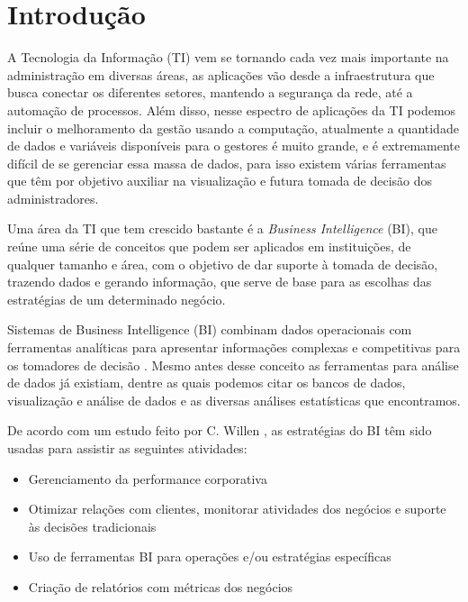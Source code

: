 \chapter*{Introdução}

A Tecnologia da Informação (TI) vem se tornando cada vez mais importante na administração em diversas áreas, as aplicações vão desde a infraestrutura que busca conectar os diferentes setores, mantendo a segurança da rede, até a automação de processos. Além disso, nesse espectro de aplicações da TI podemos incluir o melhoramento da gestão usando a computação, atualmente a quantidade de dados e variáveis disponíveis para o gestores é muito grande, e é extremamente difícil de se gerenciar essa massa de dados, para isso existem várias ferramentas que têm por objetivo auxiliar na visualização e futura tomada de decisão dos administradores.

Uma área da TI que tem crescido bastante é a \textit{Business Intelligence} (BI), que reúne uma série de conceitos que podem ser aplicados em instituições, de qualquer tamanho e área, com o objetivo de dar suporte à tomada de decisão, trazendo dados e gerando informação, que serve de base para as escolhas das estratégias de um determinado negócio.

Sistemas de Business Intelligence (BI) combinam dados operacionais com ferramentas analíticas para apresentar informações complexas e competitivas para os tomadores de decisão \cite{negash1}. Mesmo antes desse conceito as ferramentas para análise de dados já existiam, dentre as quais podemos citar os bancos de dados, visualização e análise de dados e as diversas análises estatísticas que encontramos.

De acordo com um estudo feito por C. Willen \cite{willen1}, as estratégias do BI têm sido usadas para assistir as seguintes atividades:

\begin{itemize}
	\item Gerenciamento da performance corporativa
	\item Otimizar relações com clientes, monitorar atividades dos negócios e suporte às decisões tradicionais
	\item Uso de ferramentas BI para operações e/ou estratégias específicas
	\item Criação de relatórios com métricas dos negócios
\end{itemize}


